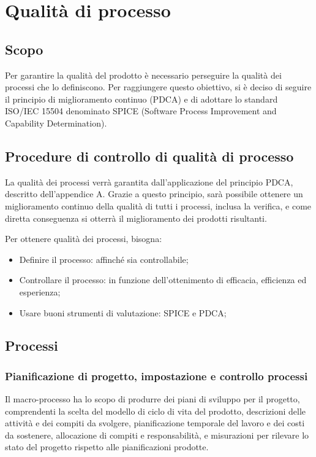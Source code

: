 \documentclass[PianoDiQualifica.tex]{subfiles}
\begin{document}
\chapter{Qualità di processo}

\section{Scopo} 
Per garantire la qualità del prodotto è necessario perseguire la qualità dei processi che lo definiscono.
Per raggiungere questo obiettivo, si è deciso di seguire il principio di miglioramento continuo (PDCA) e di adottare lo standard ISO/IEC 15504 denominato SPICE (Software Process Improvement and Capability Determination).

\section{Procedure di controllo di qualità di processo}
La qualità dei processi verrà garantita dall'applicazione del principio PDCA, descritto dell'appendice A. Grazie a questo principio, sarà possibile ottenere un miglioramento continuo della qualità di tutti i processi, inclusa la verifica, e come diretta conseguenza si otterrà il miglioramento dei prodotti risultanti. 

Per ottenere qualità dei processi, bisogna:
\begin{itemize}
	\item Definire il processo: affinché sia controllabile;
	\item Controllare il processo: in funzione dell'ottenimento di efficacia, efficienza ed esperienza;
	\item Usare buoni strumenti di valutazione: SPICE e PDCA;
\end{itemize}

\section{Processi}

\subsection{Pianificazione di progetto, impostazione e controllo processi}
Il macro-processo ha lo scopo di produrre dei piani di sviluppo per il progetto, comprendenti la scelta del modello di ciclo di vita del prodotto, descrizioni delle attività e dei compiti da svolgere, pianificazione temporale del lavoro e dei costi da sostenere, allocazione di compiti e responsabilità, e misurazioni per rilevare lo stato del progetto rispetto alle pianificazioni prodotte.
\end{document}
